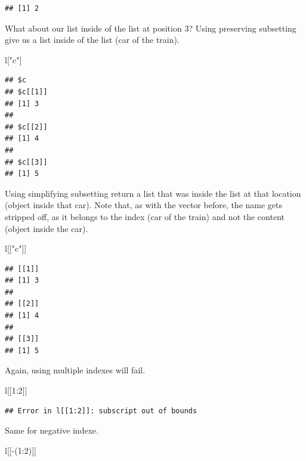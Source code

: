 \documentclass[
]{book}
\newenvironment{Shaded}{\begin{snugshade}}{\end{snugshade}}
\newcommand{\DecValTok}[1]{\textcolor[rgb]{0.00,0.00,0.81}{#1}}
\newcommand{\NormalTok}[1]{#1}
\newcommand{\SpecialCharTok}[1]{\textcolor[rgb]{0.00,0.00,0.00}{#1}}
\newcommand{\StringTok}[1]{\textcolor[rgb]{0.31,0.60,0.02}{#1}}
\begin{document}
\begin{verbatim}
## [1] 2
\end{verbatim}

What about our list inside of the list at position 3? Using preserving subsetting give us a list inside of the list (car of the train).

\begin{Shaded}
\begin{Highlighting}[]
\NormalTok{l[}\StringTok{"c"}\NormalTok{]}
\end{Highlighting}
\end{Shaded}

\begin{verbatim}
## $c
## $c[[1]]
## [1] 3
## 
## $c[[2]]
## [1] 4
## 
## $c[[3]]
## [1] 5
\end{verbatim}

Using simplifying subsetting return a list that was inside the list at that location (object inside that car). Note that, as with the vector before, the name gets stripped off, as it belongs to the index (car of the train) and not the content (object inside the car).

\begin{Shaded}
\begin{Highlighting}[]
\NormalTok{l[[}\StringTok{"c"}\NormalTok{]]}
\end{Highlighting}
\end{Shaded}

\begin{verbatim}
## [[1]]
## [1] 3
## 
## [[2]]
## [1] 4
## 
## [[3]]
## [1] 5
\end{verbatim}

Again, using multiple indexes will fail.

\begin{Shaded}
\begin{Highlighting}[]
\NormalTok{l[[}\DecValTok{1}\SpecialCharTok{:}\DecValTok{2}\NormalTok{]]}
\end{Highlighting}
\end{Shaded}

\begin{verbatim}
## Error in l[[1:2]]: subscript out of bounds
\end{verbatim}

Same for negative indexe.

\begin{Shaded}
\begin{Highlighting}[]
\NormalTok{l[[}\SpecialCharTok{{-}}\NormalTok{(}\DecValTok{1}\SpecialCharTok{:}\DecValTok{2}\NormalTok{)]]}
\end{Highlighting}
\end{Shaded}
\end{document}
